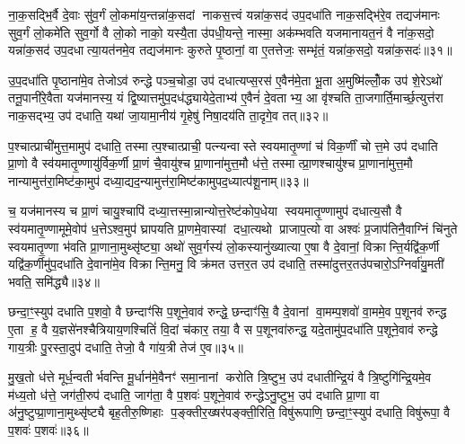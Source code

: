 {\anuvakamend[{यु॒क्तग्रा॑वा प्र॒जा मि॑थु॒न्य॑न्तरि॑ख्ष॒न्द्वाद॑श च॥६॥}]}

ना॒क॒सद्भि॒र्वै दे॒वाः सु॑व॒र्गं लो॒कमा॑य॒न्तन्ना॑क॒सदां नाकस॒त्त्वं यन्ना॑क॒सद॑ उप॒दधा॑ति नाक॒सद्भि॑रे॒व तद्यज॑मानः सुव॒र्गं लो॒कमे॑ति सुव॒र्गो वै लो॒को नाको॒ यस्यै॒ता उ॑पधी॒यन्ते॒ नास्मा॒ अक॑म्भवति यजमानायत॒नं वै ना॑क॒सदो॒ यन्ना॑क॒सद॑ उप॒दधात्या॒यत॑नमे॒व तद्यज॑मानः कुरुते पृ॒ष्ठानां॒ वा ए॒तत्तेजः॒ सम्भृ॑तं॒ यन्ना॑क॒सदो॒ यन्ना॑क॒सदः॑॥३१॥

उ॒प॒दधा॑ति पृ॒ष्ठाना॑मे॒व तेजोऽव॑ रुन्द्धे पञ्च॒चोडा॒ उप॑ दधात्यप्स॒रस॑ ए॒वैन॑मे॒ता भू॒ता अ॒मुष्मि॑ल्लोँ॒क उप॑ शे॒रेऽथो॑ तनू॒पानी॑रे॒वैता यज॑मानस्य॒ यं द्वि॒ष्यात्तमु॑प॒दध॑द्ध्यायेदे॒ताभ्य॑ ए॒वैनं॑ दे॒वताभ्य॒ आ वृ॑श्चति ता॒जगार्ति॒मार्च्छ॒त्युत्त॑रा नाक॒सद्भ्य॒ उप॑ दधाति॒ यथा॑ जा॒यामा॒नीय॑ गृ॒हेषु॑ निषा॒दय॑ति ता॒दृगे॒व तत्॥३२॥

प॒श्चात्प्राची॑मुत्त॒मामुप॑ दधाति॒ तस्मात्प॒श्चात्प्राची॒ पत्न्यन्वास्ते स्वयमातृ॒ण्णां च॑ विक॒र्णीं चोत्त॒मे उप॑ दधाति प्रा॒णो वै स्व॑यमातृ॒ण्णायु॑र्विक॒र्णी प्रा॒णं चै॒वायु॑श्च प्रा॒णाना॑मुत्त॒मौ ध॑त्ते॒ तस्मात्प्रा॒णश्चायु॑श्च प्रा॒णाना॑मुत्त॒मौ नान्यामुत्त॑रा॒मिष्ट॑का॒मुप॑ दध्या॒द्यद॒न्यामुत्त॑रा॒मिष्ट॑कामुपद॒ध्यात्प॑शू॒नाम्॥३३॥

च॒ यज॑मानस्य च प्रा॒णं चायु॒श्चापि॑ दध्या॒त्तस्मा॒न्नान्योत्त॒रेष्ट॑कोप॒धेया स्वयमातृ॒ण्णामुप॑ दधात्य॒सौ वै स्व॑यमातृ॒ण्णामूमे॒वोप॑ ध॒त्तेऽश्व॒मुप॑ घ्रापयति प्रा॒णमे॒वास्यां दधा॒त्यथो प्राजाप॒त्यो वा अश्वः॑ प्र॒जाप॑तिनै॒वाग्निं चि॑नुते स्वयमातृ॒ण्णा भ॑वति प्रा॒णाना॒मुथ्सृ॑ष्ट्या॒ अथो॑ सुव॒र्गस्य॑ लो॒कस्यानु॑ख्यात्या ए॒षा वै दे॒वानां॒ विक्रान्ति॒र्यद्वि॑क॒र्णी यद्वि॑क॒र्णीमु॑प॒दधा॑ति दे॒वाना॑मे॒व विक्रान्ति॒मनु॒ वि क्र॑मत उत्तर॒त उप॑ दधाति॒ तस्मा॑दुत्तर॒तउ॑पचारो॒ऽग्निर्वा॑यु॒मती॑ भवति॒ समि॑द्ध्यै॥३४॥

{\anuvakamend[{सम्भृ॑तं॒ यन्ना॑क॒सदो॒ यन्ना॑क॒सद॒स्तत्प॑शू॒नामे॒षां वै द्वाविꣳ॑शतिश्च॥७॥}]}

छन्दा॒ꣳ॒स्युप॑ दधाति प॒शवो॒ वै छन्दाꣳ॑सि प॒शूने॒वाव॑ रुन्द्धे॒ छन्दाꣳ॑सि॒ वै दे॒वानां वा॒मम्प॒शवो॑ वा॒ममे॒व प॒शूनव॑ रुन्द्ध ए॒ता ह॒ वै य॒ज्ञसे॑नश्चैत्रियाय॒णश्चितिं॑ वि॒दां च॑कार॒ तया॒ वै स प॒शूनवा॑रुन्द्ध॒ यदे॒तामु॑प॒दधा॑ति प॒शूने॒वाव॑ रुन्द्धे गाय॒त्रीः पु॒रस्ता॒दुप॑ दधाति॒ तेजो॒ वै गा॑य॒त्री तेज॑ ए॒व॥३५॥

मु॒ख॒तो ध॑त्ते मूर्ध॒न्वतीर्भवन्ति मू॒र्धान॑मे॒वैनꣳ॑ समा॒नानां करोति त्रि॒ष्टुभ॒ उप॑ दधातीन्द्रि॒यं वै त्रि॒ष्टुगि॑न्द्रि॒यमे॒व म॑ध्य॒तो ध॑त्ते॒ जग॑ती॒रुप॑ दधाति॒ जाग॑ता॒ वै प॒शवः॑ प॒शूने॒वाव॑ रुन्द्धेऽनु॒ष्टुभ॒ उप॑ दधाति प्रा॒णा वा अ॑नु॒ष्टुप्प्रा॒णाना॒मुथ्सृ॑ष्ट्यै बृह॒तीरु॒ष्णिहाः प॒ङ्क्तीर॒ख्षर॑पङ्क्ती॒रिति॒ विषु॑रूपाणि॒ छन्दा॒ꣳ॒स्युप॑ दधाति॒ विषु॑रूपा॒ वै प॒शवः॑ प॒शवः॑॥३६॥

